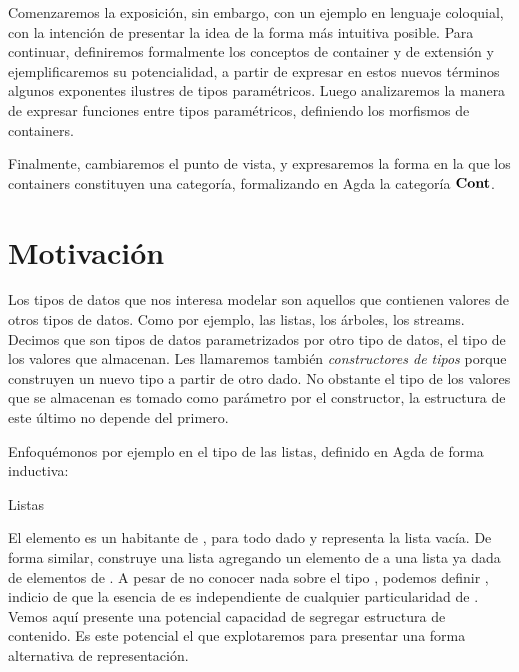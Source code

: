 Comenzaremos la exposición, sin embargo, con un ejemplo en lenguaje coloquial, con la intención de presentar la idea de la forma más intuitiva posible. Para continuar, definiremos formalmente los conceptos de container y de extensión y ejemplificaremos su potencialidad, a partir de expresar en estos nuevos términos algunos exponentes ilustres de tipos paramétricos. Luego analizaremos la manera de expresar funciones entre tipos paramétricos, definiendo los morfismos de containers.

Finalmente, cambiaremos el punto de vista, y expresaremos la forma en la que los containers constituyen una categoría, formalizando en Agda la categoría $\mathbf{Cont}$. 


\newpage
\section{Motivación}
\label{sec:containers.motivacion}

Los tipos de datos que nos interesa modelar son aquellos que contienen valores de otros tipos de datos. Como por ejemplo, las listas, los árboles, los streams. Decimos que son tipos de datos parametrizados por otro tipo de datos, el tipo de los valores que almacenan.
Les llamaremos también {\it constructores de tipos} porque construyen un nuevo tipo a partir de otro dado.
No obstante el tipo de los valores que se almacenan es tomado como parámetro por el constructor, la estructura de este último no depende del primero.

Enfoquémonos por ejemplo en el tipo de las listas, definido en Agda de forma inductiva:

\begin{agdacode}
  \label{list}
Listas
  
\end{agdacode}
El elemento  es un habitante de  , para todo  dado y representa la lista vacía.
De forma similar,  construye una lista agregando un elemento de  a una lista ya dada de elementos de .
A pesar de no conocer nada sobre el tipo , podemos definir  , indicio de que la esencia de  es independiente de cualquier particularidad de .
Vemos aquí presente una potencial capacidad de segregar estructura de contenido. Es este potencial el que explotaremos para presentar una forma alternativa de representación.

